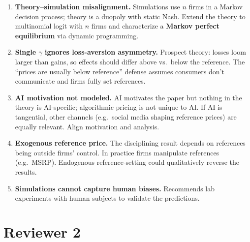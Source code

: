 \documentclass[11pt]{article}
\begin{document}
\begin{enumerate}[label=\textbf{R1.\arabic*.}]
  \item \textbf{Theory--simulation misalignment.} Simulations use $n$ firms in a Markov decision
        process; theory is a duopoly with static Nash. Extend the theory to multinomial logit with
        $n$ firms and characterize a \textbf{Markov perfect equilibrium} via dynamic programming.
  \item \textbf{Single $\gamma$ ignores loss-aversion asymmetry.} Prospect theory: losses loom larger
        than gains, so effects should differ above vs.\ below the reference. The ``prices are usually
        below reference'' defense assumes consumers don't communicate and firms fully set references.
  \item \textbf{AI motivation not modeled.} AI motivates the paper but nothing in the theory is
        AI-specific; algorithmic pricing is not unique to AI. If AI is tangential, other channels
        (e.g.\ social media shaping reference prices) are equally relevant. Align motivation and analysis.
  \item \textbf{Exogenous reference price.} The disciplining result depends on references being outside
        firms' control. In practice firms manipulate references (e.g.\ MSRP). Endogenous reference-setting
        could qualitatively reverse the results.
  \item \textbf{Simulations cannot capture human biases.} Recommends lab experiments with human subjects
        to validate the predictions.
\end{enumerate}

\section{Reviewer 2}
\end{document}
